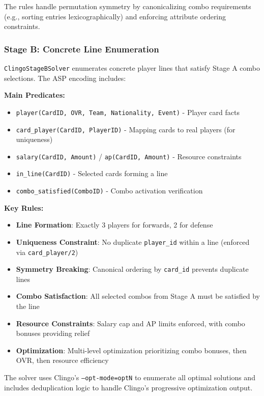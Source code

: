 The rules handle permutation symmetry by canonicalizing combo requirements (e.g., sorting entries lexicographically) and enforcing attribute ordering constraints.

\subsubsection{Stage B: Concrete Line Enumeration}

\texttt{ClingoStageBSolver} enumerates concrete player lines that satisfy Stage A combo selections. The ASP encoding includes:

\textbf{Main Predicates:}
\begin{itemize}
    \item \texttt{player(CardID, OVR, Team, Nationality, Event)} - Player card facts
    \item \texttt{card\_player(CardID, PlayerID)} - Mapping cards to real players (for uniqueness)
    \item \texttt{salary(CardID, Amount)} / \texttt{ap(CardID, Amount)} - Resource constraints
    \item \texttt{in\_line(CardID)} - Selected cards forming a line
    \item \texttt{combo\_satisfied(ComboID)} - Combo activation verification
\end{itemize}

\textbf{Key Rules:}
\begin{itemize}
    \item \textbf{Line Formation}: Exactly 3 players for forwards, 2 for defense
    \item \textbf{Uniqueness Constraint}: No duplicate \texttt{player\_id} within a line (enforced via \texttt{card\_player/2})
    \item \textbf{Symmetry Breaking}: Canonical ordering by \texttt{card\_id} prevents duplicate lines
    \item \textbf{Combo Satisfaction}: All selected combos from Stage A must be satisfied by the line
    \item \textbf{Resource Constraints}: Salary cap and AP limits enforced, with combo bonuses providing relief
    \item \textbf{Optimization}: Multi-level optimization prioritizing combo bonuses, then OVR, then resource efficiency
\end{itemize}

The solver uses Clingo's \texttt{--opt-mode=optN} to enumerate all optimal solutions and includes deduplication logic to handle Clingo's progressive optimization output.


